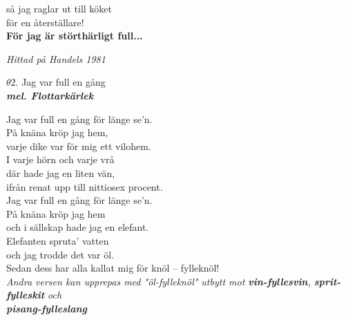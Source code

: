 \documentclass[a6paper,10pt]{article}
\newcommand{\mel}[1]{\small\textbf{\textit{mel. #1 \\}}}
\begin{document}
så jag raglar ut till köket\\
för en återställare!
\vspace{5pt}\\
\textbf{För jag är störthärligt full...}
\begin{flushright}
\textit{Hittad på Handels 1981}
\end{flushright}
\begin{center}
\Large $\theta2$. Jag var full en gång \\ 
\mel{Flottarkärlek}
\end{center}
Jag var full en gång för länge se'n. \\
På knäna kröp jag hem, \\
varje dike var för mig ett vilohem. \\
I varje hörn och varje vrå \\
där hade jag en liten vän, \\
ifrån renat upp till nittiosex procent. 
\vspace{5pt}\\
Jag var full en gång för länge se'n. \\
På knäna kröp jag hem \\
och i sällskap hade jag en elefant. \\
Elefanten spruta' vatten \\
och jag trodde det var öl. \\
Sedan dess har alla kallat mig för knöl -- fylleknöl! 
\vspace{5pt}\\
\textit{Andra versen kan upprepas med "öl-fylleknöl" utbytt mot \textbf{vin-fyllesvin}, \textbf{sprit-fylleskit} och\\ \textbf{pisang-fylleslang}}
\end{document}
